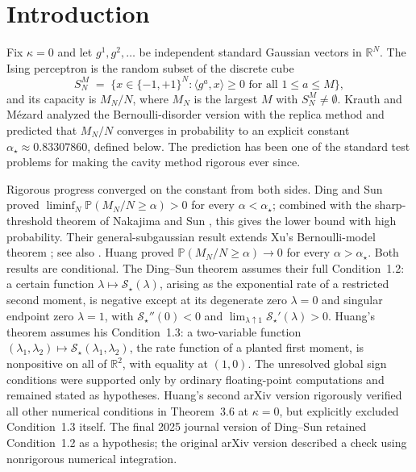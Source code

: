 \documentclass[11pt]{article}
\newcommand{\R}{\mathbb{R}}
\newcommand{\PP}{\mathbb{P}}
\begin{document}
\section{Introduction}

Fix $\kappa = 0$ and let $g^1, g^2, \ldots$ be independent standard Gaussian
vectors in $\R^N$. The Ising perceptron is the random subset of the discrete
cube
\[
  S_N^M \;=\; \bigl\{ x \in \{-1,+1\}^N : \langle g^a, x\rangle \ge 0
  \text{ for all } 1 \le a \le M \bigr\},
\]
and its capacity is $M_N/N$, where $M_N$ is the largest $M$ with
$S_N^M \neq \emptyset$. Krauth and M\'ezard \cite{krauth1989storage} analyzed
the Bernoulli-disorder version with the replica method and predicted that $M_N/N$ converges in
probability to an explicit constant $\alpha_\star \approx 0.83307860$,
defined below. The prediction has been one of the standard test problems for
making the cavity method rigorous ever since.

Rigorous progress converged on the constant from both sides. Ding and
Sun \cite{ding2018capacity} proved
$\liminf_N \PP(M_N/N \ge \alpha) > 0$ for every $\alpha < \alpha_\star$;
combined with the sharp-threshold theorem of Nakajima and Sun
\cite{nakajima2023sharp}, this gives the lower bound with high probability.
Their general-subgaussian result extends Xu's Bernoulli-model theorem
\cite{xu2021sharp}; see also \cite{altschuler2024capacity}. Huang
\cite{huang2024capacity} proved
$\PP(M_N/N \ge \alpha) \to 0$ for every $\alpha > \alpha_\star$. Both
results are conditional. The Ding--Sun theorem assumes their full
Condition~1.2: a certain function
$\lambda \mapsto \mathscr{S}_\star(\lambda)$, arising as the exponential rate
of a restricted second moment, is negative except at its degenerate zero
$\lambda=0$ and singular endpoint zero $\lambda=1$, with
$\mathscr S_\star''(0)<0$ and
$\lim_{\lambda\uparrow1}\mathscr S_\star'(\lambda)>0$. Huang's theorem assumes his
Condition~1.3: a two-variable function
$(\lambda_1,\lambda_2) \mapsto \mathcal{S}_\star(\lambda_1,\lambda_2)$,
the rate function of a planted first moment, is nonpositive on all of
$\R^2$, with equality at $(1,0)$. The unresolved global sign conditions were
supported only by ordinary floating-point computations and remained stated
as hypotheses. Huang's second arXiv version rigorously verified all other
numerical conditions in Theorem~3.6 at $\kappa=0$, but explicitly excluded
Condition~1.3 itself. The final 2025 journal version of Ding--Sun retained
Condition~1.2 as a hypothesis; the original arXiv version described a check using nonrigorous
numerical integration.
\end{document}
